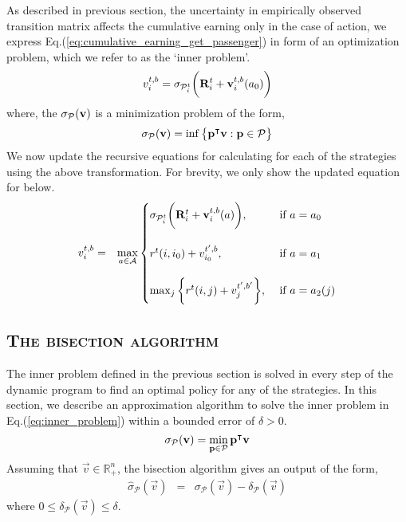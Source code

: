 As described in previous section, the uncertainty in empirically observed transition matrix affects the cumulative earning only in the case of {\getpassenger} action, we express Eq.(\ref{eq:cumulative_earning_get_passenger}) in form of an optimization problem, which we refer to as the `inner problem'.
\begin{equation}
v_{i}^{t,b} = \sigma_{\mathcal{P}_{i}^{t}} \bigg({\mathbf{R}}_{i}^{t} + \mathbf{v}_{i}^{t,b}({a_0})\bigg)
\end{equation}
where, the $\sigma_{\mathcal{P}}(\mathbf{v})$ is a minimization problem of the form,
\begin{equation}
\sigma_{\mathcal{P}}(\mathbf{v}) = \inf\big\{ \mathbf{p}^\intercal\mathbf{v}: \mathbf{p} \in \mathcal{P} \big\}
\end{equation}
We now update the recursive equations for calculating {\totalexpectedearnings} for each of the strategies using the above transformation. For brevity, we only show the updated equation for {\relocationflexible} below.
\begin{eqnarray}
\label{eq:robust_relocationflexible_strategy}
v_{i}^{t,b} &=& \max_{a \in \mathcal{A}}
    \begin{cases}
    \sigma_{\mathcal{P}_{i}^{t}} \bigg({\mathbf{R}}_{i}^{t} + \mathbf{v}_{i}^{t,b}({a})\bigg), &\textrm{  if } a = a_0\\ \\
    r^t(i,{i_0}) + v_{{i_0}}^{t',b}, &\textrm{  if } a = a_1 \\ \\
    \max_{j} \bigg\{r^t(i,j) + v_{j}^{t',b'}\bigg\}, &\textrm{  if } a = a_2(j)
    \end{cases}
\end{eqnarray}

\subsection{\textsc{The bisection algorithm}}

The inner problem defined in the previous section is solved in every step of the dynamic program to find an optimal policy for any of the strategies. In this section, we describe an approximation algorithm to solve the inner problem in Eq.(\ref{eq:inner_problem}) within a bounded error of $\delta > 0$.
\begin{equation}
\sigma_{\mathcal{P}}(\mathbf{v}) = \min_{\mathbf{p} \in \mathcal{P}} \mathbf{p}^\intercal\mathbf{v}
\label{eq:inner_problem}
\end{equation}
Assuming that $\vec{v} \in \mathbb{R}^n_+$, the bisection algorithm gives an output of the form,
\begin{eqnarray}
\hat{\sigma}_{\mathcal{P}} (\vec{v}) &=& \sigma_{\mathcal{P}} (\vec{v}) - \delta_{\mathcal{P}}(\vec{v})
\end{eqnarray} 
where $0 \leq \delta_{\mathcal{P}}(\vec{v}) \leq \delta$.

